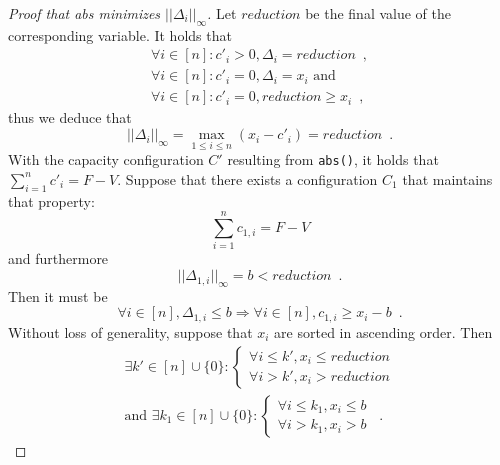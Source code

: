 \begin{proof}[Proof that abs minimizes $||\Delta_i||_{\infty}$]
  Let $reduction$ be the final value of the corresponding variable. It holds that
  \begin{equation*}
  \begin{gathered}
    \forall i \in [n] : c'_i > 0, \Delta_i = reduction \enspace, \\
    \forall i \in [n] : c'_i = 0, \Delta_i = x_i \mbox{ and} \\
    \forall i \in [n] : c'_i = 0, reduction \geq x_i \enspace,
  \end{gathered}
  \end{equation*}
  thus we deduce that
  \begin{equation*}
    ||\Delta_i||_{\infty} = \max\limits_{1 \leq i \leq n}{\left(x_i - c'_i\right)} = reduction \enspace.
  \end{equation*}
  With the capacity configuration $C'$ resulting from \texttt{abs()}, it holds that $\sum\limits_{i=1}^nc'_i = F - V$.
  Suppose that there exists a configuration $C_1$ that maintains that property:
  \begin{equation}
  \label{abs:c1valid}
    \sum\limits_{i=1}^nc_{1, i} = F - V
  \end{equation}
  and furthermore
  \begin{equation}
  \label{abs:b}
    ||\Delta_{1, i}||_\infty = b < reduction \enspace.
  \end{equation}
  Then it must be
  \begin{equation*}
    \forall i \in [n], \Delta_{1, i} \leq b \Rightarrow \forall i \in [n], c_{1, i} \geq x_i - b \enspace.
  \end{equation*}
  Without loss of generality, suppose that $x_i$ are sorted in ascending order. Then
  \begin{equation*}
  \begin{gathered}
    \exists k' \in [n] \cup \{0\} :
    \begin{cases}
      \forall i \leq k', x_i \leq reduction \\
      \forall i > k', x_i > reduction
    \end{cases} \\
    \mbox{and } \exists k_1 \in [n] \cup \{0\} :
    \begin{cases}
      \forall i \leq k_1, x_i \leq b \\
      \forall i > k_1, x_i > b
    \end{cases} \enspace.
  \end{gathered}

\end{equation*}
\end{proof}

